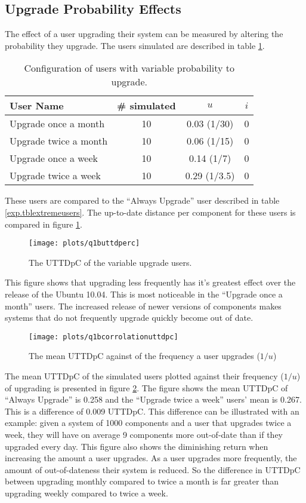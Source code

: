 \subsection{Upgrade Probability Effects}
The effect of a user upgrading their system can be measured by altering the probability they upgrade.
The users simulated are described in table \ref{exp.tblq1busers}.
\begin{table}[h!]
\centering
\begin{tabular}{|l | c | c | c |}
\hline
User Name 				& \# simulated 	& $u$ 		& $i$ 			\\ \hline
Upgrade once a month	& 10 			& 0.03 (1/30)			& 0				 \\
Upgrade twice a month	& 10 			& 0.06 (1/15)		& 0				\\
Upgrade once a week		& 10 			& 0.14 (1/7)		& 0				 \\
Upgrade twice a week 	& 10 			& 0.29 (1/3.5)		& 0				\\ \hline
\end{tabular}
\caption{Configuration of users with variable probability to upgrade.}
\label{exp.tblq1busers}
\end{table}
These users are compared to the ``Always Upgrade'' user described in table \ref{exp.tblextremeusers}.
The up-to-date distance per component for these users is compared in figure \ref{exp.q1buttdperc}.
\begin{figure}[htp]
\begin{center}
  \texttt{[image: plots/q1buttdperc]}
  \caption{The UTTDpC of the variable upgrade users.}
  \label{exp.q1buttdperc}
\end{center}
\end{figure}
This figure shows that upgrading less frequently has it's greatest effect over the release of the Ubuntu 10.04.
This is most noticeable in the ``Upgrade once a month'' users.
The increased release of newer versions of components makes systems that do not frequently upgrade quickly become out of date.

\begin{figure}[htp]
\begin{center}
  \texttt{[image: plots/q1bcorrolationuttdpc]}
  \caption{The mean UTTDpC against of the frequency a user upgrades ($1/u$)}
  \label{exp.q1bcorrolationuttdpc}
\end{center}
\end{figure}
The mean UTTDpC of the simulated users plotted against their frequency ($1/u$) of upgrading is presented in figure \ref{exp.q1bcorrolationuttdpc}.
The figure shows the mean UTTDpC of ``Always Upgrade'' is 0.258 and the ``Upgrade twice a week'' users' mean is 0.267.
This is a difference of 0.009 UTTDpC.
This difference can be illustrated with an example: 
given a system of 1000 components and a user that upgrades twice a week,
they will have on average 9 components more out-of-date than if they upgraded every day. 
This figure also shows the diminishing return when increasing the amount a user upgrades.
As a user upgrades more frequently, the amount of out-of-dateness their system is reduced.
So the difference in UTTDpC between upgrading monthly compared to twice a month is far greater than upgrading weekly compared to twice a week.

